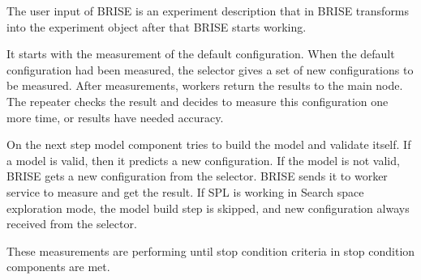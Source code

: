 The user input of BRISE is an experiment description that in BRISE transforms into the experiment object after that BRISE starts working.

It starts with the measurement of the default configuration. When the default configuration had been measured, the selector gives a set of new configurations to be measured. After measurements, workers return the results to the main node. The repeater checks the result and decides to measure this configuration one more time, or results have needed accuracy. 

On the next step model component tries to build the model and validate itself. If a model is valid, then it predicts a new configuration. If the model is not valid, BRISE gets a new configuration from the selector. BRISE sends it to worker service to measure and get the result. If SPL is working in Search space exploration mode, the model build step is skipped, and new configuration always received from the selector. 

These measurements are performing until stop condition criteria in stop condition components are met.
